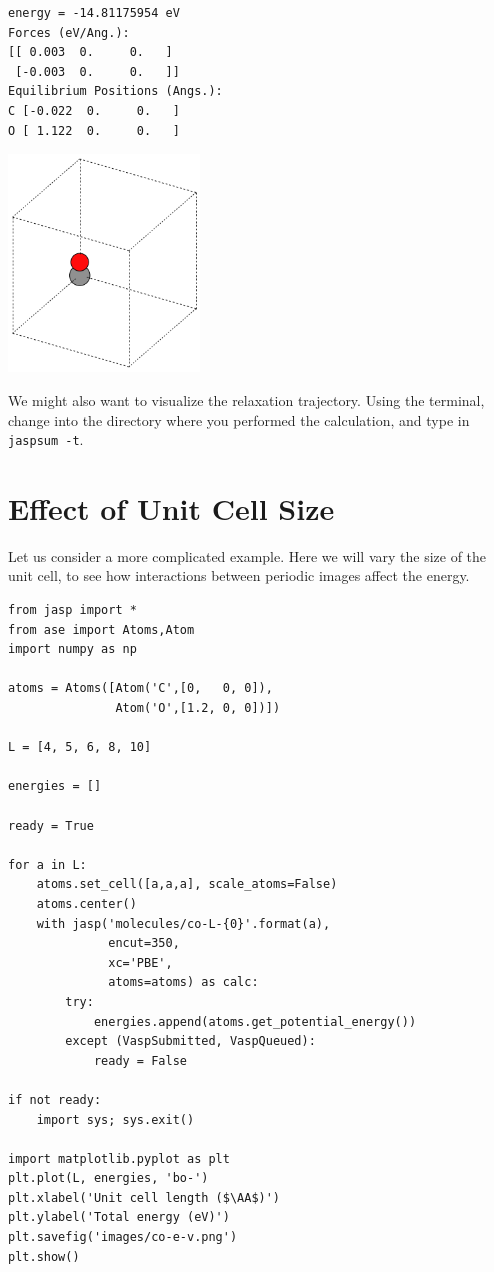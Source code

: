 \documentclass[11pt]{article}
\begin{document}
\begin{verbatim}
energy = -14.81175954 eV
Forces (eV/Ang.):
[[ 0.003  0.     0.   ]
 [-0.003  0.     0.   ]]
Equilibrium Positions (Angs.):
C [-0.022  0.     0.   ]
O [ 1.122  0.     0.   ]
\end{verbatim}

\includegraphics[width=2in]{./images/CO-relaxed.png}


We might also want to visualize the relaxation trajectory. Using the terminal, change into the directory where you performed the calculation, and type in \verb~jaspsum -t~.


\section{Effect of Unit Cell Size}
\label{sec-7}

Let us consider a more complicated example. Here we will vary the size of the unit cell, to see how interactions between periodic images affect the energy.

\begin{verbatim}
from jasp import *
from ase import Atoms,Atom
import numpy as np

atoms = Atoms([Atom('C',[0,   0, 0]),
               Atom('O',[1.2, 0, 0])])

L = [4, 5, 6, 8, 10]

energies = []

ready = True

for a in L:
    atoms.set_cell([a,a,a], scale_atoms=False)
    atoms.center()
    with jasp('molecules/co-L-{0}'.format(a),
              encut=350,
              xc='PBE',
              atoms=atoms) as calc:
        try:
            energies.append(atoms.get_potential_energy())
        except (VaspSubmitted, VaspQueued):
            ready = False

if not ready:
    import sys; sys.exit()

import matplotlib.pyplot as plt
plt.plot(L, energies, 'bo-')
plt.xlabel('Unit cell length ($\AA$)')
plt.ylabel('Total energy (eV)')
plt.savefig('images/co-e-v.png')
plt.show()
\end{verbatim}
\end{document}
